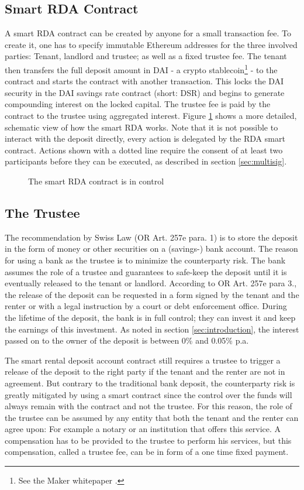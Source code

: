 \documentclass[12pt,a4paper,titlepage,oneside,english]{article}
\begin{document}
\subsection{Smart RDA Contract}
A smart RDA contract can be created by anyone for a small transaction fee. To create it, one has to specify immutable Ethereum addresses for the three involved parties: Tenant, landlord and trustee; as well as a fixed trustee fee. The tenant then transfers the full deposit amount in DAI - a crypto stablecoin\footnote{See the Maker whitepaper \cite{MakerWhitepaper}.} - to the contract and starts the contract with another transaction. This locks the DAI security in the DAI savings rate contract (short: DSR) and begins to generate compounding interest on the locked capital. The trustee fee is paid by the contract to the trustee using aggregated interest.
Figure \ref{fig:contract} shows a more detailed, schematic view of how the smart RDA works. Note that it is not possible to interact with the deposit directly, every action is delegated by the RDA smart contract. Actions shown with a dotted line require the consent of at least two participants before they can be executed, as described in section \ref{sec:multisig}.

\begin{figure}[h]
\caption{The smart RDA contract is in control}
\label{fig:contract}
\end{figure}

\subsection{The Trustee}
The recommendation by Swiss Law (OR Art. 257e para. 1) is to store the deposit in the form of money or other securities on a (savings-) bank account. The reason for using a bank as the trustee is to minimize the counterparty risk. The bank assumes the role of a trustee and guarantees to safe-keep the deposit until it is eventually released to the tenant or landlord. According to OR Art. 257e para 3., the release of the deposit can be requested in a form signed by the tenant and the renter or with a legal instruction by a court or debt enforcement office. During the lifetime of the deposit, the bank is in full control; they can invest it and keep the earnings of this investment. As noted in section \ref{sec:introduction}, the interest passed on to the owner of the deposit is between 0\% and 0.05\% p.a. 

The smart rental deposit account contract still requires a trustee to trigger a release of the deposit to the right party if the tenant and the renter are not in agreement. But contrary to the traditional bank deposit, the counterparty risk is greatly mitigated by using a smart contract since the control over the funds will always remain with the contract and not the trustee.
For this reason, the role of the trustee can be assumed by any entity that both the tenant and the renter can agree upon: For example a notary or an institution that offers this service. A compensation has to be provided to the trustee to perform his services, but this compensation, called a trustee fee, can be in form of a one time fixed payment.
\end{document}
